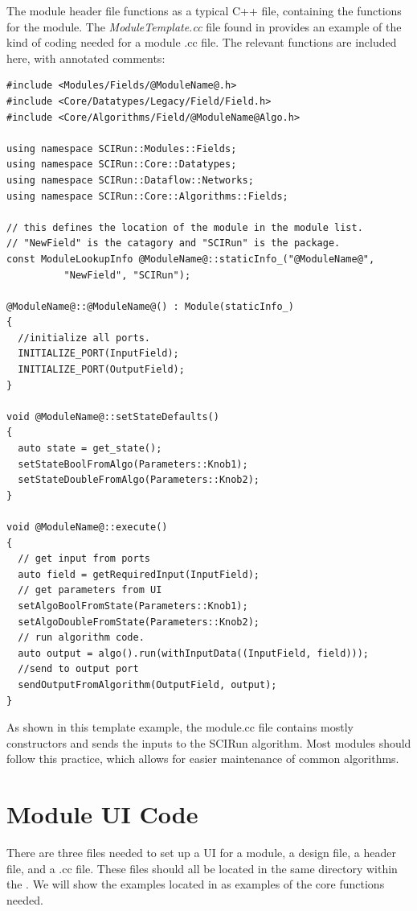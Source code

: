 \documentclass[fleqn,11pt,openany]{book}
\begin{document}
The module header file functions as a typical C++ file, containing the functions for the module.  
The \emph{ModuleTemplate.cc} file found in \emph{} provides an example of the kind of coding needed for a module .cc file.  
The relevant functions are included here, with annotated comments:
\begin{verbatim}
#include <Modules/Fields/@ModuleName@.h>
#include <Core/Datatypes/Legacy/Field/Field.h>
#include <Core/Algorithms/Field/@ModuleName@Algo.h>

using namespace SCIRun::Modules::Fields;
using namespace SCIRun::Core::Datatypes;
using namespace SCIRun::Dataflow::Networks;
using namespace SCIRun::Core::Algorithms::Fields;

// this defines the location of the module in the module list.  
// "NewField" is the catagory and "SCIRun" is the package.
const ModuleLookupInfo @ModuleName@::staticInfo_("@ModuleName@", 
          "NewField", "SCIRun");

@ModuleName@::@ModuleName@() : Module(staticInfo_)
{
  //initialize all ports.
  INITIALIZE_PORT(InputField);
  INITIALIZE_PORT(OutputField);
}

void @ModuleName@::setStateDefaults()
{
  auto state = get_state();
  setStateBoolFromAlgo(Parameters::Knob1);
  setStateDoubleFromAlgo(Parameters::Knob2);
}

void @ModuleName@::execute()
{
  // get input from ports
  auto field = getRequiredInput(InputField);
  // get parameters from UI
  setAlgoBoolFromState(Parameters::Knob1);
  setAlgoDoubleFromState(Parameters::Knob2);
  // run algorithm code.  
  auto output = algo().run(withInputData((InputField, field)));
  //send to output port
  sendOutputFromAlgorithm(OutputField, output);
}
\end{verbatim}

As shown in this template example, the module.cc file contains mostly constructors and sends the inputs to the SCIRun algorithm.
Most modules should follow this practice, which allows for easier maintenance of common algorithms.   


\section{Module UI Code}
\label{sec:ui}

There are three files needed to set up a UI for a module, a design file, a header file, and a .cc file.  
These files should all be located in the same directory within the \emph{}. 
We will show the examples located in \emph{} as examples of the core functions needed.
\end{document}
